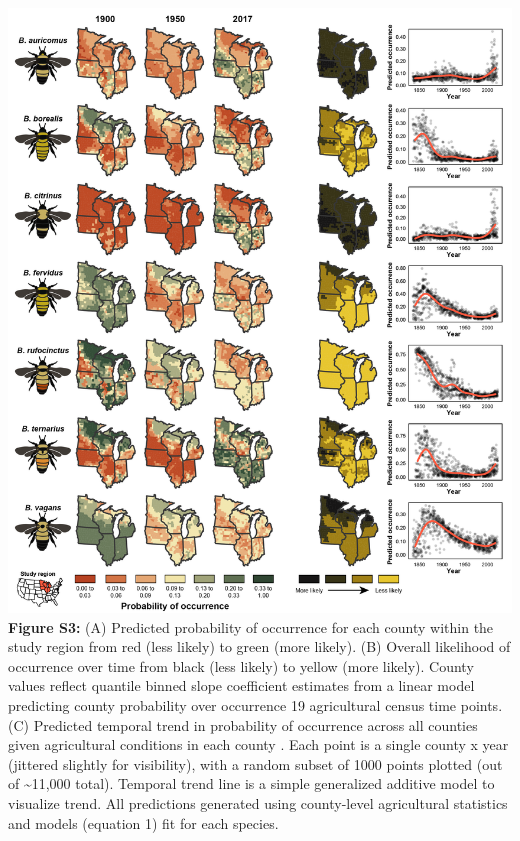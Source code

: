 \documentclass[11pt,]{article}
\begin{document}
\newpage

\includegraphics[width=1\textwidth,height=\textheight]{../ms_figs/fig_s3.png}
\textbf{Figure S3:} (A) Predicted probability of occurrence for each
county within the study region from red (less likely) to green (more
likely). (B) Overall likelihood of occurrence over time from black (less
likely) to yellow (more likely). County values reflect quantile binned
slope coefficient estimates from a linear model predicting county
probability over occurrence 19 agricultural census time points. (C)
Predicted temporal trend in probability of occurrence across all
counties given agricultural conditions in each county . Each point is a
single county x year (jittered slightly for visibility), with a random
subset of 1000 points plotted (out of \textasciitilde{}11,000 total).
Temporal trend line is a simple generalized additive model to visualize
trend. All predictions generated using county-level agricultural
statistics and models (equation 1) fit for each species. \clearpage

\newpage
\end{document}
